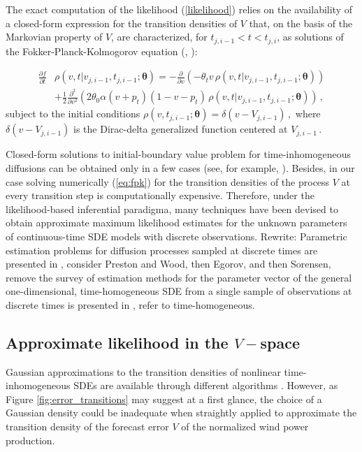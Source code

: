 \documentclass[11pt]{article}
\theoremstyle{definition}
\begin{document}
The exact computation of the likelihood (\ref{likelihood}) relies on the availability of a closed-form expression for the transition densities of $V$ that, on the basis of the Markovian property of $V$, are characterized, for $ t_{j, i-1} < t < t_{j,i}$,  as solutions of the Fokker-Planck-Kolmogorov equation (\cite[36]{iacus1}, \cite[61-68]{saso}):

\begin{align}
\frac{ \partial f }{\partial t } & \rho(v ,t \vert v_{j,i-1} ,  t_{j,i-1} ; \bm{\theta} )= - \frac{\partial}{ \partial v} (- \theta_t v \, \rho(v ,t \vert v_{j,i-1} ,  t_{j,i-1} ; \bm{\theta} ) ) \nonumber \\
& + \frac{1}{2} \frac{\partial^2}{ \partial v^2} ( 2 \theta_0 \alpha (v+ p_t) (1 - v- p_t) \, \rho(v ,t \vert v_{j,i-1} ,  t_{j,i-1} ; \bm{\theta} ) )\,,  \label{eq:fpk}
\end{align}
subject to the initial conditions $\rho(v , t_{j, i-1} ; \bm{\theta} ) = \delta(v - V_{j, i-1}) \,,$ where $ \delta(v - V_{j, i-1})$ is the Dirac-delta generalized function centered at $ V_{j, i-1}\,.$

Closed-form solutions to initial-boundary value problem for time-in\-ho\-mo\-geneous diffusions can be obtained only in a few cases (see, for example, \autocite[Section 3.1]{eglix}). Besides, in our case solving numerically (\ref{eq:fpk}) for the transition densities of the process $V$ at every transition step is computationally expensive. 
Therefore, under the likelihood-based inferential paradigma, many techniques have been devised to obtain approximate maximum likelihood estimates for the unknown parameters of continuous-time SDE models with discrete observations. 
 {\color{red} Rewrite: Parametric estimation problems for diffusion processes sampled at discrete times are presented in \autocite[Chapter 3]{iacus1}, consider Preston and Wood, then Egorov, and then Sorensen, remove the
 survey of estimation methods for the parameter vector of the general one-dimensional, time-homogeneous SDE from a single sample of observations at discrete times is presented in \autocite{hurn}, refer to time-homogeneous.}

\subsection{Approximate likelihood  in the $V-$space} \label{moments_ODEs}

Gaussian approximations to the transition densities of nonlinear time-in\-ho\-mo\-geneous SDEs are available through different algorithms \autocite[Chapter 9]{saso}. However, as Figure \ref{fig:error_transitions} may suggest at a first glance, the choice of a Gaussian density could be inadequate when straightly applied to approximate the transition density of the forecast error $V$ of the normalized wind power production. 
\end{document}
